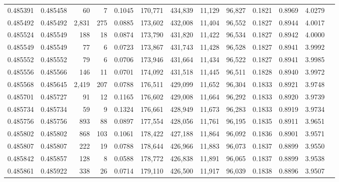 \begin{tabular}{rrrrrrrrrrrrr}
0.485391 & 0.485458 &    60 &     7 &                                     0.1045 & 170,771 & 434,839 &  11,129 &  96,827 & 0.1821 & 0.8969 & 4.0279 \\
0.485492 & 0.485492 & 2,831 &   275 &                                     0.0885 & 173,602 & 432,008 &  11,404 &  96,552 & 0.1827 & 0.8944 & 4.0017 \\
0.485524 & 0.485549 &   188 &    18 &                                     0.0874 & 173,790 & 431,820 &  11,422 &  96,534 & 0.1827 & 0.8942 & 4.0000 \\
0.485549 & 0.485549 &    77 &     6 &                                     0.0723 & 173,867 & 431,743 &  11,428 &  96,528 & 0.1827 & 0.8941 & 3.9992 \\
0.485552 & 0.485552 &    79 &     6 &                                     0.0706 & 173,946 & 431,664 &  11,434 &  96,522 & 0.1827 & 0.8941 & 3.9985 \\
0.485556 & 0.485566 &   146 &    11 &                                     0.0701 & 174,092 & 431,518 &  11,445 &  96,511 & 0.1828 & 0.8940 & 3.9972 \\
0.485568 & 0.485645 & 2,419 &   207 &                                     0.0788 & 176,511 & 429,099 &  11,652 &  96,304 & 0.1833 & 0.8921 & 3.9748 \\
0.485701 & 0.485727 &    91 &    12 &                                     0.1165 & 176,602 & 429,008 &  11,664 &  96,292 & 0.1833 & 0.8920 & 3.9739 \\
0.485734 & 0.485734 &    59 &     9 &                                     0.1324 & 176,661 & 428,949 &  11,673 &  96,283 & 0.1833 & 0.8919 & 3.9734 \\
0.485756 & 0.485756 &   893 &    88 &                                     0.0897 & 177,554 & 428,056 &  11,761 &  96,195 & 0.1835 & 0.8911 & 3.9651 \\
0.485802 & 0.485802 &   868 &   103 &                                     0.1061 & 178,422 & 427,188 &  11,864 &  96,092 & 0.1836 & 0.8901 & 3.9571 \\
0.485807 & 0.485807 &   222 &    19 &                                     0.0788 & 178,644 & 426,966 &  11,883 &  96,073 & 0.1837 & 0.8899 & 3.9550 \\
0.485842 & 0.485857 &   128 &     8 &                                     0.0588 & 178,772 & 426,838 &  11,891 &  96,065 & 0.1837 & 0.8899 & 3.9538 \\
0.485861 & 0.485922 &   338 &    26 &                                     0.0714 & 179,110 & 426,500 &  11,917 &  96,039 & 0.1838 & 0.8896 & 3.9507 \\

\end{tabular}
